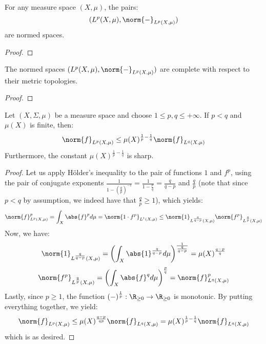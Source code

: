         \begin{lemma} \label{lemma: minkowski_inequality}
            For any measure space $(X, \mu)$, the pairs:
                $$(L^p(X, \mu), \norm{-}_{L^p(X, \mu)})$$
            are normed spaces.
        \end{lemma}
            \begin{proof}
            \end{proof}
        \begin{theorem} \label{theorem: L_p_space_completeness}
            The normed spaces $(L^p(X, \mu), \norm{-}_{L^p(X, \mu)})$ are complete with respect to their metric topologies.
        \end{theorem}
            \begin{proof}
            \end{proof}


        \begin{lemma} \label{lemma: comparing_L_p_norms_for_finite_measures}
            Let $(X, \Sigma, \mu)$ be a measure space and choose $1 \leq p, q \leq +\infty$. If $p < q$ and $\mu(X)$ is finite, then:
                $$\norm{f}_{L^p(X, \mu)} \leq \mu(X)^{\frac1p - \frac1q} \norm{f}_{L^q(X, \mu)}$$
            Furthermore, the constant $\mu(X)^{\frac1p - \frac1q}$ is sharp.
        \end{lemma}
            \begin{proof}
                Let us apply H\"older's inequality to the pair of functions $1$ and $f^p$, using the pair of conjugate exponents $\frac{1}{1 - \left(\frac{q}{p}\right)^{-1}} = \frac{1}{1 - \frac{p}{q}} = \frac{q}{q - p}$ and $\frac{q}{p}$ (note that since $p < q$ by assumption, we indeed have that $\frac{q}{p} \geq 1$), which yields:
                    $$\norm{f}_{L^p(X, \mu)}^p = \int_X \abs{f}^p d\mu = \norm{ 1 \cdot f^p }_{L^1(X, \mu)} \leq \norm{1}_{L^{\frac{q}{q - p}}(X, \mu)} \norm{f^p}_{L^{\frac{q}{p}}(X, \mu)}$$
                Now, we have:
                    $$\norm{1}_{L^{\frac{q}{q - p}}(X, \mu)} = \left(\int_X \abs{1}^{\frac{q}{q - p}} d\mu\right)^{ \frac{1}{\frac{q}{q - p}} } = \mu(X)^{ \frac{q - p}{q} }$$
                    $$\norm{f^p}_{L^{\frac{q}{p}}(X, \mu)} = \left( \int_X \abs{f}^q d\mu \right)^{\frac{p}{q}} = \norm{f}_{L^q(X, \mu)}^p$$
                Lastly, since $p \geq 1$, the function $(-)^{\frac1p}: \R_{\geq 0} \to \R_{\geq 0}$ is monotonic. By putting everything together, we yield:
                    $$\norm{f}_{L^p(X, \mu)} \leq \mu(X)^{ \frac{q - p}{qp} } \norm{f}_{L^q(X, \mu)} = \mu(X)^{\frac1p - \frac1q} \norm{f}_{L^q(X, \mu)}$$
                which is as desired.
            \end{proof}


